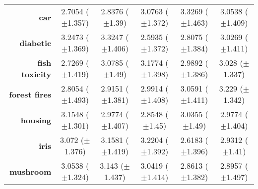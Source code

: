 \begin{table}[htb]
{\begin{tabular}{r|ccccc}
                  \textbf{car}                 & \cellcolor[rgb]{ .388,  .745,  .482}2.7054 ($\pm$1.357) & \cellcolor[rgb]{ .62,  .812,  .494}2.8376 ($\pm$1.39)   & \cellcolor[rgb]{ 1,  .882,  .51}3.0763 ($\pm$1.372)     & \cellcolor[rgb]{ .973,  .412,  .42}3.3269 ($\pm$1.463)  & \cellcolor[rgb]{ 1,  .922,  .518}3.0538 ($\pm$1.409)    \\
                  \textbf{diabetic}            & \cellcolor[rgb]{ .98,  .545,  .447}3.2473 ($\pm$1.369)  & \cellcolor[rgb]{ .973,  .412,  .42}3.3247 ($\pm$1.406)  & \cellcolor[rgb]{ .388,  .745,  .482}2.5935 ($\pm$1.372) & \cellcolor[rgb]{ .69,  .831,  .498}2.8075 ($\pm$1.384)  & \cellcolor[rgb]{ 1,  .922,  .518}3.0269 ($\pm$1.411)    \\
                  \textbf{fish toxicity}       & \cellcolor[rgb]{ .388,  .745,  .482}2.7269 ($\pm$1.419) & \cellcolor[rgb]{ .992,  .753,  .486}3.0785 ($\pm$1.49)  & \cellcolor[rgb]{ .973,  .412,  .42}3.1774 ($\pm$1.398)  & \cellcolor[rgb]{ .918,  .898,  .51}2.9892 ($\pm$1.386)  & \cellcolor[rgb]{ 1,  .922,  .518}3.028 ($\pm$1.337)     \\
                  \textbf{forest fires}        & \cellcolor[rgb]{ .388,  .745,  .482}2.8054 ($\pm$1.493) & \cellcolor[rgb]{ .745,  .847,  .502}2.9151 ($\pm$1.381) & \cellcolor[rgb]{ 1,  .922,  .518}2.9914 ($\pm$1.408)    & \cellcolor[rgb]{ .996,  .776,  .49}3.0591 ($\pm$1.411)  & \cellcolor[rgb]{ .973,  .412,  .42}3.229 ($\pm$1.342)   \\
                  \textbf{housing}             & \cellcolor[rgb]{ .973,  .412,  .42}3.1548 ($\pm$1.301)  & \cellcolor[rgb]{ 1,  .922,  .518}2.9774 ($\pm$1.407)    & \cellcolor[rgb]{ .388,  .745,  .482}2.8548 ($\pm$1.45)  & \cellcolor[rgb]{ .992,  .757,  .486}3.0355 ($\pm$1.49)  & \cellcolor[rgb]{ 1,  .922,  .518}2.9774 ($\pm$1.404)    \\
                  \textbf{iris}                & \cellcolor[rgb]{ 1,  .922,  .518}3.072 ($\pm$1.376)     & \cellcolor[rgb]{ .984,  .627,  .463}3.1581 ($\pm$1.419) & \cellcolor[rgb]{ .973,  .412,  .42}3.2204 ($\pm$1.392)  & \cellcolor[rgb]{ .388,  .745,  .482}2.6183 ($\pm$1.396) & \cellcolor[rgb]{ .808,  .867,  .506}2.9312 ($\pm$1.41)  \\
                  \textbf{mushroom}            & \cellcolor[rgb]{ 1,  .863,  .51}3.0538 ($\pm$1.324)     & \cellcolor[rgb]{ .973,  .412,  .42}3.143 ($\pm$1.437)   & \cellcolor[rgb]{ 1,  .922,  .518}3.0419 ($\pm$1.414)    & \cellcolor[rgb]{ .388,  .745,  .482}2.8613 ($\pm$1.382) & \cellcolor[rgb]{ .502,  .776,  .486}2.8957 ($\pm$1.497) \\

\end{tabular}}
\end{table}
